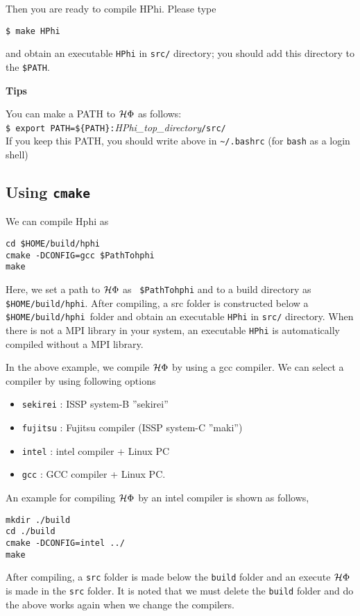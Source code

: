Then you are ready to compile HPhi.
Please type
\begin{verbatim}
$ make HPhi
\end{verbatim}
and obtain an executable \verb|HPhi| in \verb|src/| directory;
you should add this directory to the \verb|$PATH|.



\begin{screen}
\Large 
{\bf Tips}
\normalsize

You can make a PATH to $\mathcal{H} \Phi$ as follows:
\\
\verb|$ export PATH=${PATH}:|\textit{HPhi\_top\_directory}\verb|/src/|
\\
If you keep this PATH, you should write above in \verb|~/.bashrc|
(for \verb|bash| as a login shell)

\end{screen}


\subsection{Using \texttt{cmake}}
We can compile Hphi as
\begin{verbatim}
cd $HOME/build/hphi
cmake -DCONFIG=gcc $PathTohphi
make
\end{verbatim}
Here, we set a path to $\mathcal{H} \Phi$ as \verb| $PathTohphi| and to a build directory as \verb| $HOME/build/hphi|. After compiling, a src folder is constructed below a \verb| $HOME/build/hphi |folder and obtain an executable \verb|HPhi| in \verb|src/| directory. When there is not a MPI library in your system, an executable \verb|HPhi| is automatically compiled without a MPI library.

In the above example, we compile $\mathcal{H} \Phi$ by using a gcc compiler. We can select a compiler by using following options
\begin{itemize}
\item \verb|sekirei| : ISSP system-B ''sekirei''
\item \verb|fujitsu| : Fujitsu compiler (ISSP system-C ''maki'')
\item \verb|intel| : intel compiler + Linux PC
\item \verb|gcc| : GCC compiler + Linux PC.
\end{itemize}
An example for compiling $\mathcal{H} \Phi$ by an intel compiler is shown as follows, 
\begin{verbatim}
mkdir ./build
cd ./build
cmake -DCONFIG=intel ../
make
\end{verbatim}
After compiling,  a \verb|src| folder is made below the \verb|build| folder and an execute $\mathcal{H} \Phi$ is made in the  \verb|src| folder. It is noted that  we must delete the  \verb|build| folder and do the above works again when we change the compilers.
